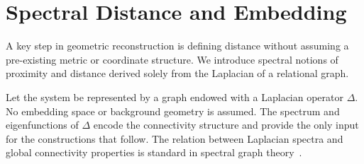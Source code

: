 \section{Spectral Distance and Embedding}
  \label{sec:spectral-distance-and-embedding}

  A key step in geometric reconstruction is defining distance without assuming
  a pre-existing metric or coordinate structure.
  We introduce spectral notions of proximity and distance derived solely from
  the Laplacian of a relational graph.

  Let the system be represented by a graph endowed with a Laplacian operator
  $\Delta$.
  No embedding space or background geometry is assumed.
  The spectrum and eigenfunctions of $\Delta$ encode the connectivity structure
  and provide the only input for the constructions that follow.
  The relation between Laplacian spectra and global connectivity properties
  is standard in spectral graph theory~\cite{Chung1997}.

  
  
  
  
